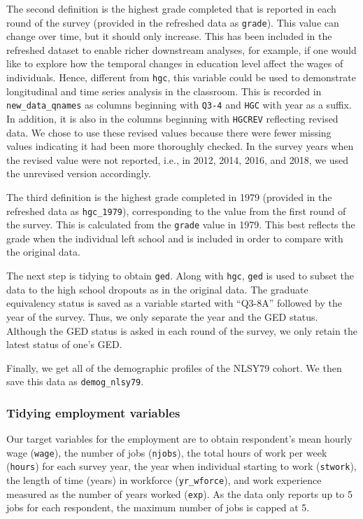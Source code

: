\documentclass[12pt]{article}
\begin{document}
The second definition is the highest grade completed that is reported in each round of the survey (provided in the refreshed data as \texttt{grade}). This value can change over time, but it should only increase. This has been included in the refreshed dataset to enable richer downstream analyses, for example, if one would like to explore how the temporal changes in education level affect the wages of individuals. Hence, different from \texttt{hgc}, this variable could be used to demonstrate longitudinal and time series analysis in the classroom. This is recorded in \texttt{new\_data\_qnames} as columns beginning with \texttt{Q3-4} and \texttt{HGC} with year as a suffix. In addition, it is also in the columns beginning with \texttt{HGCREV} reflecting revised data. We chose to use these revised values because there were fewer missing values indicating it had been more thoroughly checked. In the survey years when the revised value were not reported, i.e., in 2012, 2014, 2016, and 2018, we used the unrevised version accordingly.

The third definition is the highest grade completed in 1979 (provided in the refreshed data as \texttt{hgc\_1979}), corresponding to the value from the first round of the survey. This is calculated from the \texttt{grade} value in 1979. This best reflects the grade when the individual left school and is included in order to compare with the original data.

The next step is tidying to obtain \texttt{ged}. Along with \texttt{hgc}, \texttt{ged} is used to subset the data to the high school dropouts as in the original data. The graduate equivalency status is saved as a variable started with ``Q3-8A'' followed by the year of the survey. Thus, we only separate the year and the GED status. Although the GED status is asked in each round of the survey, we only retain the latest status of one's GED.

Finally, we get all of the demographic profiles of the NLSY79 cohort. We then save this data as \texttt{demog\_nlsy79}.

\hypertarget{tidyemp}{%
\subsubsection{Tidying employment variables}\label{tidyemp}}

Our target variables for the employment are to obtain respondent's mean hourly wage (\texttt{wage}), the number of jobs (\texttt{njobs}), the total hours of work per week (\texttt{hours}) for each survey year, the year when individual starting to work (\texttt{stwork}), the length of time (years) in workforce (\texttt{yr\_wforce}), and work experience measured as the number of years worked (\texttt{exp}). As the data only reports up to 5 jobs for each respondent, the maximum number of jobs is capped at 5.
\end{document}
